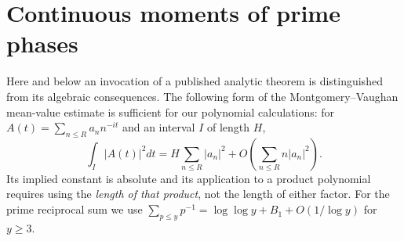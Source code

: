 \documentclass[11pt,reqno]{amsart}
\numberwithin{equation}{section}
\begin{document}
\section{Continuous moments of prime phases}\label{sec:continuous}
Here and below an invocation of a published analytic theorem is distinguished
from its algebraic consequences.  The following form of the Montgomery--Vaughan
mean-value estimate is sufficient for our polynomial calculations:
for $A(t)=\sum_{n\le R}a_n n^{-it}$ and an interval $I$ of length $H$,
\begin{equation}\label{eq:MVinput}
\int_I|A(t)|^2dt=H\sum_{n\le R}|a_n|^2
 +O\left(\sum_{n\le R}n|a_n|^2\right).
\end{equation}
Its implied constant is absolute and its application to a product polynomial
requires using the \emph{length of that product}, not the length of either
factor.  For the prime reciprocal sum we use
$\sum_{p\le y}p^{-1}=\log\log y+B_1+O(1/\log y)$ for $y\ge3$.
\end{document}
